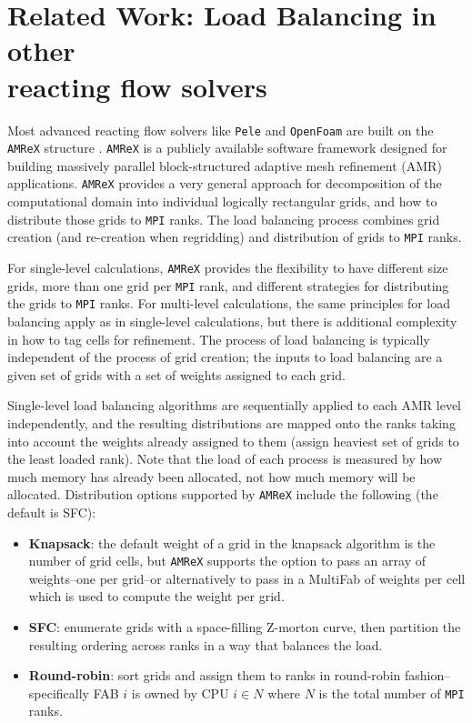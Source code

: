 \documentclass[letterpaper,twocolumn,10pt]{article}
\begin{document}
\section{Related Work: Load Balancing in other \\reacting flow solvers}
Most advanced reacting flow solvers like \texttt{Pele} \cite{PeleC,PeleMP} and \texttt{OpenFoam} \cite{DLBFoam_1,DLBFoam_2} are built on the \texttt{AMReX} structure \cite{AMReX}. \texttt{AMReX} is a publicly available software framework designed for building massively parallel block-structured adaptive mesh refinement (AMR) applications. \texttt{AMReX} provides a very general approach for decomposition of the computational domain into individual logically rectangular grids, and how to distribute those grids to \texttt{MPI} ranks. The load balancing process combines grid creation (and re-creation when regridding) and distribution of grids to \texttt{MPI} ranks.

For single-level calculations, \texttt{AMReX} provides the flexibility to have different size grids, more than one grid per \texttt{MPI} rank, and different strategies for distributing the grids to \texttt{MPI} ranks. For multi-level calculations, the same principles for load balancing apply as in single-level calculations, but there is additional complexity in how to tag cells for refinement. The process of load balancing is typically independent of the process of grid creation; the inputs to load balancing are a given set of grids with a set of weights assigned to each grid.

Single-level load balancing algorithms are sequentially applied to each AMR level independently, and the resulting distributions are mapped onto the ranks taking into account the weights already assigned to them (assign heaviest set of grids to the least loaded rank). Note that the load of each process is measured by how much memory has already been allocated, not how much memory will be allocated. Distribution options supported by \texttt{AMReX} include the following (the default is SFC):
\begin{itemize}
\setlength\itemsep{0.01em}
    \item \textbf{Knapsack}: the default weight of a grid in the knapsack algorithm is the number of grid cells, but \texttt{AMReX} supports the option to pass an array of weights--one per grid--or alternatively to pass in a MultiFab of weights per cell which is used to compute the weight per grid.
    \item \textbf{SFC}: enumerate grids with a space-filling Z-morton curve, then partition the resulting ordering across ranks in a way that balances the load.
    \item \textbf{Round-robin}: sort grids and assign them to ranks in round-robin fashion--specifically FAB $i$ is owned by CPU $i \in N$ where $N$ is the total number of \texttt{MPI} ranks.
\end{itemize}
\end{document}
